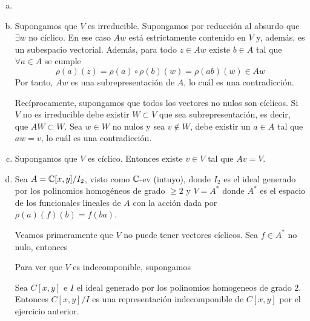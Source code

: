 \documentclass[twoside]{article}
\begin{document}
\begin{solucion}
\begin{enumerate}[(a)]
\item[]
\item Supongamos que $V$ es irreducible. Supongamos por reducción al absurdo que $\exists w$ no cíclico. En ese caso $Aw$ está estrictamente contenido en $V$ y, además, es un subespacio vectorial. Además, para todo $z \in Aw$ existe $b \in A$ tal que $\forall a \in A$ se cumple
$$
\rho(a)(z) = \rho(a)\circ \rho(b) (w) = \rho(ab) (w) \in Aw
$$
Por tanto, $Aw$ es una subrepresentación de $A$, lo cuál es una contradicción.


Recíprocamente, supongamos que todos los vectores no nulos son cíclicos. Si $V$ no es irreducible debe existir $W\subset V$ que sea subrepresentación, es decir, que $AW\subset W$. Sea $w\in W$ no nulos y sea $v \notin W$, debe existir un $a \in A$ tal que $aw = v$, lo cuál es una contradicción.
\item Supongamos que $V$ es cíclico. Entonces existe $v\in V$ tal que $Av = V$. 

\item Sea $A = \mathbb{C}[x,y]/I_2$, visto como $\mathbb{C}$-ev (intuyo), donde $I_2$ es el ideal generado por los polinomios homogéneos de grado $\geq 2$ y $V = A^*$ donde $A^*$ es el espacio de los funcionales lineales de $A$ con la acción dada por $\rho(a)(f)(b) = f(ba)$. 

Veamos primeramente que $V$ no puede tener vectores cíclicos. Sea $f \in A^*$ no nulo, entonces 

Para ver que $V$ es indecomponible, supongamos 


Sea $C[x,y]$ e $I$ el ideal generado por los polinomios homogeneos de grado $2$. Entonces $C[x,y]/I$ es una representación indecomponible de $C[x,y]$ por el ejercicio anterior. 
\end{enumerate}
\end{solucion}
\end{document}

